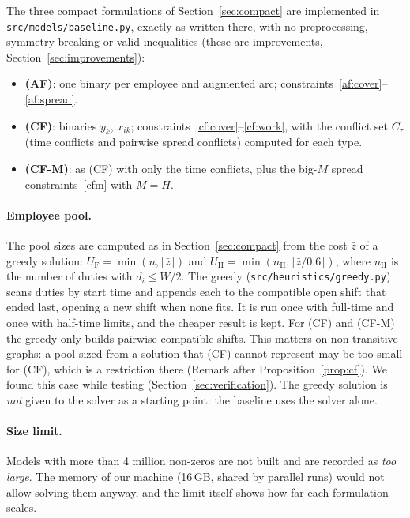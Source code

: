 The three compact formulations of Section~\ref{sec:compact} are implemented
in \texttt{src/models/baseline.py}, exactly as written there, with no
preprocessing, symmetry breaking or valid inequalities (these are
improvements, Section~\ref{sec:improvements}):
\begin{itemize}[nosep]
  \item \textbf{(AF)}: one binary per employee and augmented arc;
    constraints~\eqref{af:cover}--\eqref{af:spread}.
  \item \textbf{(CF)}: binaries $y_k$, $x_{ik}$;
    constraints~\eqref{cf:cover}--\eqref{cf:work}, with the conflict set
    $C_\tau$ (time conflicts and pairwise spread conflicts) computed for each
    type.
  \item \textbf{(CF-M)}: as (CF) with only the time conflicts, plus the
    big-$M$ spread constraints~\eqref{cfm} with $M=H$.
\end{itemize}

\paragraph{Employee pool.} The pool sizes are computed as in
Section~\ref{sec:compact} from the cost $\bar z$ of a greedy solution:
$U_{\mathrm F}=\min(n,\lfloor\bar z\rfloor)$ and
$U_{\mathrm H}=\min(n_{\mathrm H},\lfloor\bar z/0.6\rfloor)$, where
$n_{\mathrm H}$ is the number of duties with $d_i\le W/2$. The greedy
(\texttt{src/heuristics/greedy.py}) scans duties by start time and appends
each to the compatible open shift that ended last, opening a new shift when
none fits. It is run once with full-time and once with half-time limits, and
the cheaper result is kept. For (CF) and (CF-M) the greedy only builds
pairwise-compatible shifts. This matters on non-transitive graphs: a pool
sized from a solution that (CF) cannot represent may be too small for (CF),
which is a restriction there (Remark after Proposition~\ref{prop:cf}). We
found this case while testing (Section~\ref{sec:verification}). The greedy
solution is \emph{not} given to the solver as a starting point: the baseline
uses the solver alone.

\paragraph{Size limit.} Models with more than 4 million non-zeros are not
built and are recorded as \emph{too large}. The memory of our machine
(16\,GB, shared by parallel runs) would not allow solving them anyway, and
the limit itself shows how far each formulation scales.

